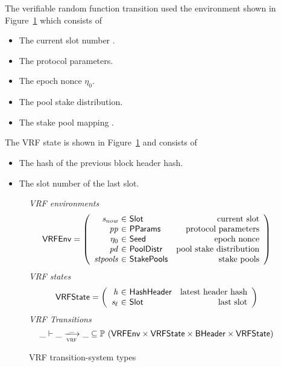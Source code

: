 The verifiable random function transition used the environment shown in
Figure~\ref{fig:ts-types:vrf} which consists of

\begin{itemize}
\item The current slot number .
\item The protocol parameters.
\item The epoch nonce $\eta_0$.
\item The pool stake distribution.
\item The stake pool mapping .
\end{itemize}

The VRF state is shown in Figure~\ref{fig:ts-types:vrf} and consists of

\begin{itemize}
\item The hash  of the previous block header hash.
\item The slot  number of the last slot.
\end{itemize}

\begin{figure}
  \emph{VRF environments}
  \begin{equation*}
    \VRFEnv =
    \left(
      \begin{array}{r@{~\in~}lr}
        \var{s_{now}} & \Slot & \text{current slot} \\
        \var{pp} & \PParams & \text{protocol parameters} \\
        \eta_0 & \Seed & \text{epoch nonce} \\
        \var{pd} & \PoolDistr & \text{pool stake distribution} \\
        \var{stpools} & \StakePools & \text{stake pools} \\
      \end{array}
    \right)
  \end{equation*}
  \emph{VRF states}
  \begin{equation*}
    \VRFState =
    \left(
      \begin{array}{r@{~\in~}lr}
        \var{h} & \HashHeader & \text{latest header hash} \\
        \var{s_\ell} & \Slot & \text{last slot} \\
      \end{array}
    \right)
  \end{equation*}
  \emph{VRF Transitions}
  \begin{equation*}
    \_ \vdash \var{\_} \trans{vrf}{\_} \var{\_} \subseteq
    \powerset (\VRFEnv \times \VRFState \times \BHeader \times \VRFState)
  \end{equation*}
  \caption{VRF transition-system types}
  \label{fig:ts-types:vrf}
\end{figure}

